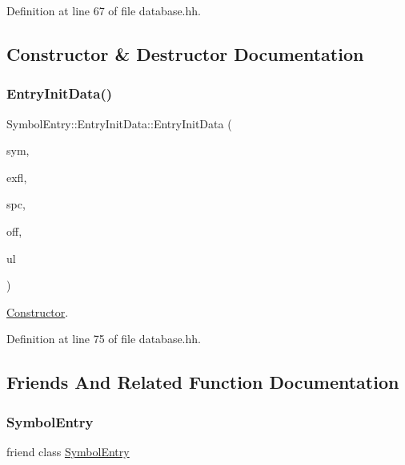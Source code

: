 Definition at line 67 of file database.\+hh.



\subsection{Constructor \& Destructor Documentation}
\mbox{\label{class_symbol_entry_1_1_entry_init_data_aefec5777eddf06f9add2823bce0bc561}} 
\subsubsection{\texorpdfstring{EntryInitData()}{EntryInitData()}}
{\footnotesize\ttfamily Symbol\+Entry\+::\+Entry\+Init\+Data\+::\+Entry\+Init\+Data (\begin{DoxyParamCaption}\item[{\mbox{\hyperlink{class_symbol}{Symbol}} $\ast$}]{sym,  }\item[{uint4}]{exfl,  }\item[{\mbox{\hyperlink{class_addr_space}{Addr\+Space}} $\ast$}]{spc,  }\item[{int4}]{off,  }\item[{const \mbox{\hyperlink{class_range_list}{Range\+List}} \&}]{ul }\end{DoxyParamCaption})\hspace{0.3cm}{\ttfamily [inline]}}



\mbox{\hyperlink{class_constructor}{Constructor}}. 



Definition at line 75 of file database.\+hh.



\subsection{Friends And Related Function Documentation}
\mbox{\label{class_symbol_entry_1_1_entry_init_data_a66ab73b76c4868b7a9981390ad794dbc}} 
\subsubsection{\texorpdfstring{SymbolEntry}{SymbolEntry}}
{\footnotesize\ttfamily friend class \mbox{\hyperlink{class_symbol_entry}{Symbol\+Entry}}\hspace{0.3cm}{\ttfamily [friend]}}



